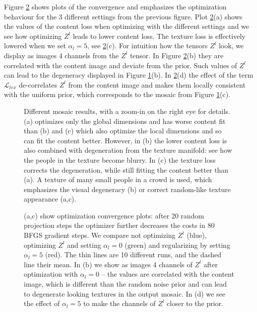 \documentclass{article}
\begin{document}
Figure \ref{fig_regl2} shows plots of the convergence and emphasizes the optimization behaviour for the 3 different settings from the previous figure. Plot \ref{fig_regl2}(a) shows the values of the content loss when optimizing with the different settings and we see how optimizing $Z^l$ leads to lower content loss. The texture loss is effectively lowered when we set $\alpha_l =5$, see \ref{fig_regl2}(c). For intuition how the tensors $Z^l$ look, we display as images 4 channels from the  $Z^l$ tensor. In Figure \ref{fig_regl2}(b) they are correlated with the content image and deviate from the prior. Such values of $Z^l$ can lead to the degeneracy displayed in Figure \ref{fig_regl1}(b). In \ref{fig_regl2}(d) the effect of the term $\mathcal{L}_{tex}$ de-correlates $Z^l$ from the content image and makes them locally consistent with the uniform prior, which corresponds to the mosaic from Figure \ref{fig_regl1}(c).

\begin{figure}
\centering
{}
\caption{Different mosaic results, with a zoom-in on the right eye for details. (a) optimizes only the global dimensions and has worse content fit than (b) and (c) which also optimize the local dimensions and so can fit the content better. However, in (b) the lower content loss is also combined with degeneration from the texture manifold: see how the people in the texture become blurry. In (c) the texture loss corrects the degeneration, while still fitting the content better than (a). A texture of many small people in a crowd is used, which emphasizes the visual degeneracy (b) or correct random-like texture appearance (a,c).}\label{fig_regl1}
\end{figure}

\begin{figure}[tb]
\centering
{}

\caption{(a,c) show optimization convergence plots: after 20 random projection steps the optimizer further decreases the costs in 80 BFGS gradient steps. We compare not optimizing $Z^l$ (blue), optimizing $Z^l$ and setting $\alpha_l=0$ (green) and regularizing by setting $\alpha_l=5$ (red). The thin lines are 10 different runs, and the dashed line their mean. In (b) we show as images 4 channels of $Z^l$ after optimization with $\alpha_l=0$ -- the values are correlated with the content image, which is different than the random noise prior and can lead to degenerate looking textures in the output mosaic. In (d) we see the effect of $\alpha_l=5$ to make the channels of $Z^l$ closer to the prior.}
\label{fig_regl2}
\end{figure}
\end{document}
